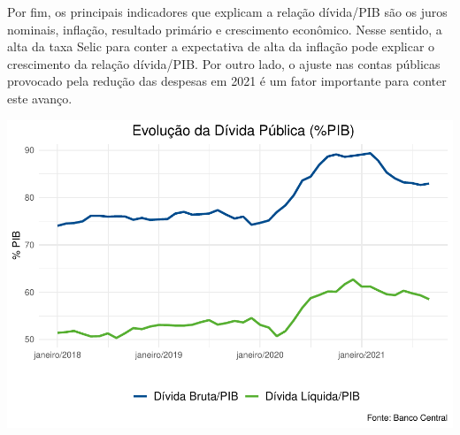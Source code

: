 \documentclass[100,a4paperpaper,]{article}
\begin{document}
Por fim, os principais indicadores que explicam a relação dívida/PIB são
os juros nominais, inflação, resultado primário e crescimento econômico.
Nesse sentido, a alta da taxa Selic para conter a expectativa de alta da
inflação pode explicar o crescimento da relação dívida/PIB. Por outro
lado, o ajuste nas contas públicas provocado pela redução das despesas
em 2021 é um fator importante para conter este avanço.

\includegraphics{politica-fiscal_files/figure-latex/Divida PIB-1.pdf}
\end{document}
